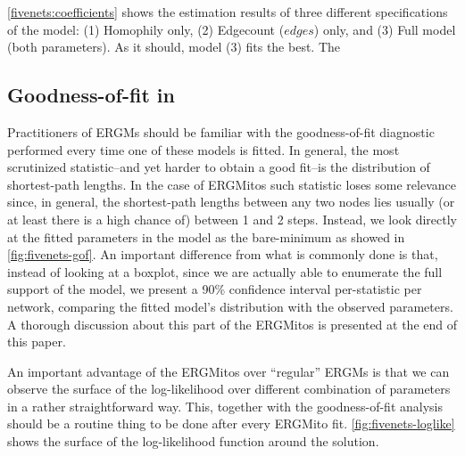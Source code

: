 \documentclass[12pt]{article}
\begin{document}
\autoref{fivenets:coefficients} shows the estimation results of three different specifications of the model: (1) Homophily only, (2) Edgecount ($edges$) only, and (3) Full model (both parameters). As it should, model (3) fits the best. The 



\subsection{Goodness-of-fit in \ergmitos}

Practitioners of ERGMs should be familiar with the goodness-of-fit diagnostic performed every time one of these models is fitted. In general, the most scrutinized statistic--and yet harder to obtain a good fit--is the distribution of shortest-path lengths. In the case of ERGMitos such statistic loses some relevance since, in general, the shortest-path lengths between any two nodes lies usually (or at least there is a high chance of) between 1 and 2 steps. Instead, we look directly at the fitted parameters in the model as the bare-minimum as showed in \autoref{fig:fivenets-gof}. An important difference from what is commonly done is that, instead of looking at a boxplot, since we are actually able to enumerate the full support of the model, we present a 90\% confidence interval per-statistic per network, comparing the fitted model's distribution with the observed parameters. A thorough discussion about this part of the ERGMitos is presented at the end of this paper.

An important advantage of the ERGMitos over ``regular'' ERGMs is that we can observe the surface of the log-likelihood over different combination of parameters in a rather straightforward way. This, together with the goodness-of-fit analysis should be a routine thing to be done after every ERGMito fit. \autoref{fig:fivenets-loglike} shows the surface of the log-likelihood function around the solution.
\end{document}

